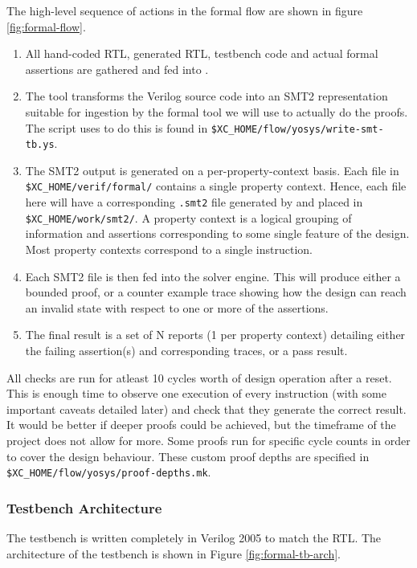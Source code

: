 The high-level sequence of actions in the formal flow are shown in figure
\ref{fig:formal-flow}.

\begin{enumerate}
\item All hand-coded RTL, generated RTL, testbench code and actual
    formal assertions are gathered and fed into \yosys.
\item The \yosys tool transforms the Verilog source code into an SMT2
    representation suitable for ingestion by the formal tool we will use
    to actually do the proofs.
    The script \yosys uses to do this is found in
    {\tt \$XC\_HOME/flow/yosys/write-smt-tb.ys}.
\item The SMT2 output is generated on a per-property-context basis.
    Each file in
    {\tt \$XC\_HOME/verif/formal/}
    contains a single property context.
    Hence, each file here will have a corresponding {\tt .smt2}
    file generated by \yosys and placed in
    {\tt \$XC\_HOME/work/smt2/}.
    A property context is a logical grouping of information and assertions
    corresponding to some single feature of the design.
    Most property contexts correspond to a single instruction.
\item Each SMT2 file is then fed into the solver engine.
    This will produce either a bounded proof, or a counter example trace
    showing how the design can reach an invalid state with respect to
    one or more of the assertions.
\item The final result is a set of N reports (1 per property context)
    detailing either the failing assertion(s) and corresponding traces,
    or a pass result.
\end{enumerate}

All checks are run for atleast 10 cycles worth of design operation after
a reset.
This is enough time to observe one execution of every instruction (with
some important caveats detailed later) and check that they generate the
correct result.
It would be better if deeper proofs could be achieved, but the timeframe of
the project does not allow for more.
Some proofs run for specific cycle counts in order to cover the design
behaviour.
These custom proof depths are specified in 
{\tt \$XC\_HOME/flow/yosys/proof-depths.mk}.

\subsubsection{Testbench Architecture}

The testbench is written completely in Verilog 2005 to match the RTL.
The architecture of the testbench is shown in Figure
\ref{fig:formal-tb-arch}.

